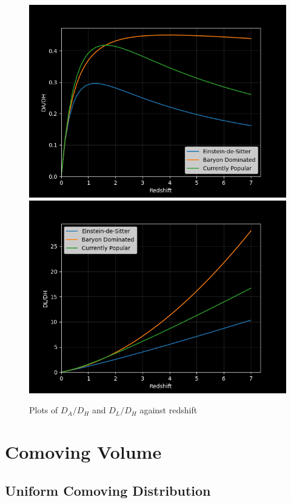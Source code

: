 \documentclass{article}
\begin{document}
\begin{figure}[ht!]
	\includegraphics[width=\textwidth]{DADH.png}
	\includegraphics[width=\textwidth]{DLDH.png}
	\caption{Plots of $D_A/D_H$ and $D_L/D_H$ against redshift}
\end{figure}

\clearpage

\section{Comoving Volume}

\subsection{Uniform Comoving Distribution}
\end{document}
